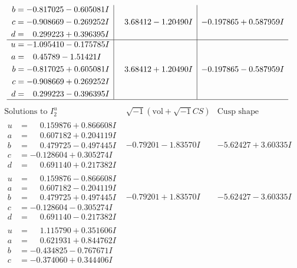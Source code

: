 \documentclass[1p]{elsarticle_modified}
\theoremstyle{definition}
\newcommand{\I}{\sqrt{-1}}
\begin{document}
$$\begin{array}{c|c|c}
\begin{aligned}
b &= -0.817025 - 0.605081 I \\
c &= -0.908669 - 0.269252 I \\
d &= \phantom{-}0.299223 + 0.396395 I\end{aligned}
 & \phantom{-}3.68412 - 1.20490 I & -0.197865 + 0.587959 I \\ \hline\begin{aligned}
u &= -1.095410 - 0.175785 I \\
a &= \phantom{-}0.45789 - 1.51421 I \\
b &= -0.817025 + 0.605081 I \\
c &= -0.908669 + 0.269252 I \\
d &= \phantom{-}0.299223 - 0.396395 I\end{aligned}
 & \phantom{-}3.68412 + 1.20490 I & -0.197865 - 0.587959 I\\
 \hline 
 \end{array}$$\newpage$$\begin{array}{c|c|c}  
\text{Solutions to }I^u_{2}& \I (\text{vol} + \sqrt{-1}CS) & \text{Cusp shape}\\
 \hline 
\begin{aligned}
u &= \phantom{-}0.159876 + 0.866608 I \\
a &= \phantom{-}0.607182 + 0.204119 I \\
b &= \phantom{-}0.479725 - 0.497445 I \\
c &= -0.128604 + 0.305274 I \\
d &= \phantom{-}0.691140 + 0.217382 I\end{aligned}
 & -0.79201 - 1.83570 I & -5.62427 + 3.60335 I \\ \hline\begin{aligned}
u &= \phantom{-}0.159876 - 0.866608 I \\
a &= \phantom{-}0.607182 - 0.204119 I \\
b &= \phantom{-}0.479725 + 0.497445 I \\
c &= -0.128604 - 0.305274 I \\
d &= \phantom{-}0.691140 - 0.217382 I\end{aligned}
 & -0.79201 + 1.83570 I & -5.62427 - 3.60335 I \\ \hline\begin{aligned}
u &= \phantom{-}1.115790 + 0.351606 I \\
a &= \phantom{-}0.621931 + 0.844762 I \\
b &= -0.434825 - 0.767671 I \\
c &= -0.374060 + 0.344406 I \\

\end{aligned}
\end{array}$$
\end{document}
